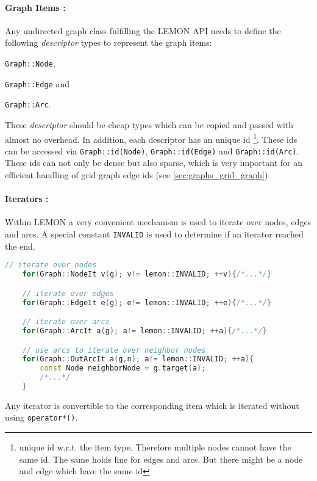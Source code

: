 \paragraph{Graph Items :}
    Any undirected graph class fulfilling the LEMON API needs to define 
    the following \emph{descriptor} types to represent the graph items:
    \begin{inparaenum}[(i)]
    \item \lstinline{Graph::Node},
    \item \lstinline{Graph::Edge} and
    \item \lstinline{Graph::Arc}.
    \end{inparaenum}
    These \emph{descriptor} should be cheap types which can be copied
    and passed with almost no overhead.
    In addition, each descriptor has an unique id
    \footnote{ unique id w.r.t. the item type. 
    Therefore  multiple  nodes cannot have the same id.
    The same holds line for edges and arcs.
    But there might be a node and edge which have the same id}.
    These ids can be accessed via \lstinline{Graph::id(Node)}, \lstinline{Graph::id(Edge)} and \lstinline{Graph::id(Arc)}.
    These ids can not only be dense but also sparse, which is very
    important for an efficient handling of grid graph edge ids (see \cref{sec:graphs_grid_graph}).


\label{par:lemon_iterators}
\paragraph{Iterators :}
    Within LEMON a very convenient mechanism is used to iterate over
    nodes, edges and arcs.
    A special constant \lstinline{INVALID} is used to determine if 
    an iterator reached the end.

    \begin{lstlisting}[language=c++]
    // iterate over nodes
    for(Graph::NodeIt v(g); v!= lemon::INVALID; ++v){/*...*/}

    // iterate over edges
    for(Graph::EdgeIt e(g); e!= lemon::INVALID; ++e){/*...*/}

    // iterate over arcs
    for(Graph::ArcIt a(g); a!= lemon::INVALID; ++a){/*...*/}

    // use arcs to iterate over neighbor nodes
    for(Graph::OutArcIt a(g,n); a!= lemon::INVALID; ++a){
        const Node neighborNode = g.target(a);
        /*...*/
    }
    \end{lstlisting}

    Any iterator is convertible to the corresponding item which
    is iterated without using \lstinline{operator*()}.

